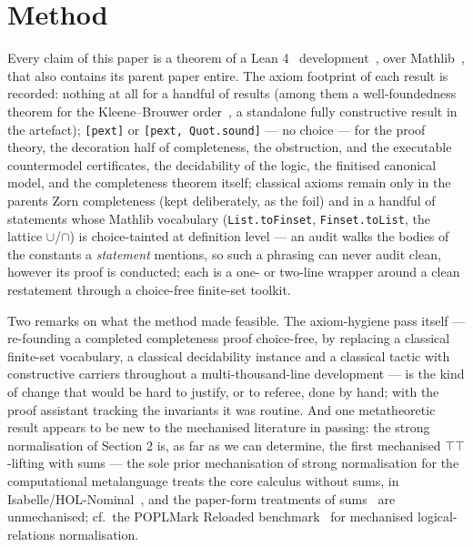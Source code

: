 \section{Method}\label{9-method}

Every claim of this paper is a theorem of a Lean
4~\cite{DeMouraUllrich2021} development~\cite{BeliefArtefact}, over
Mathlib~\cite{MathlibCommunity2020}, that also contains its parent
paper entire. The axiom footprint of each
result is recorded: nothing at all for a handful of results (among them
a well-foundedness theorem for the Kleene--Brouwer
order~\cite{Kechris1995}, a standalone
fully constructive result in the artefact); \texttt{[pext]} or
\texttt{[pext, Quot.sound]} --- no choice --- for the proof theory, the
decoration half of completeness, the obstruction, and the executable
countermodel certificates, the decidability of the logic, the finitised
canonical model, and the completeness theorem itself; classical axioms
remain only in the parent\textquotesingle s Zorn completeness (kept deliberately, as
the foil) and in a handful of statements whose Mathlib vocabulary
(\texttt{List.toFinset}, \texttt{Finset.toList}, the lattice
\ensuremath{\cup}/\ensuremath{\cap}) is choice-tainted at definition level --- an audit
walks the bodies of the constants a \emph{statement} mentions, so such
a phrasing can never audit clean, however its proof is conducted; each
is a one- or two-line wrapper around a clean restatement through a
choice-free finite-set toolkit.

Two remarks on what the method made feasible. The axiom-hygiene pass
itself --- re-founding a completed completeness proof choice-free, by
replacing a classical finite-set vocabulary, a classical decidability
instance and a classical tactic with constructive carriers throughout
a multi-thousand-line development --- is the kind of change that would
be hard to justify, or to referee, done by hand; with the proof
assistant tracking the invariants it was routine. And one metatheoretic
result appears to be new to the mechanised literature in passing: the
strong normalisation of Section 2 is, as far as we can determine, the
first mechanised \ensuremath{\top\top}-lifting with sums --- the sole prior
mechanisation of strong normalisation for the computational
metalanguage treats the core calculus without sums, in
Isabelle/HOL-Nominal~\cite{DoczkalSchwinghammer2009}, and the
paper-form treatments of sums~\cite{Lindley2005,LindleyStark2005} are
unmechanised; cf.\ the POPLMark Reloaded
benchmark~\cite{AbelEtAl2019} for mechanised logical-relations
normalisation.

